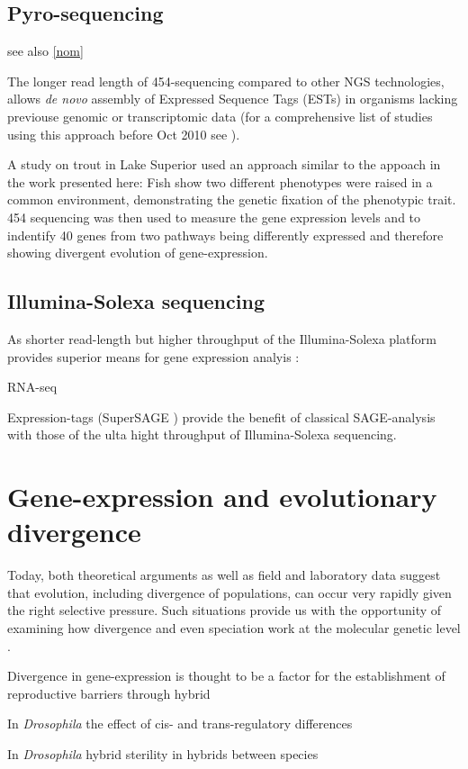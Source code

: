\subsection{Pyro-sequencing}
\label{pyro-seq}

see also \ref{nom}

The longer read length of 454-sequencing \cite{pmid16056220} compared
to other NGS technologies, allows \textit{de novo} assembly of
Expressed Sequence Tags (ESTs) in organisms lacking previouse genomic
or transcriptomic data (for a comprehensive list of studies using this
approach before Oct 2010 see \cite{pmid20950480}).

A study on trout in Lake Superior \cite{pmid20331779} used an approach
similar to the appoach in the work presented here: Fish show two
different phenotypes were raised in a common environment,
demonstrating the genetic fixation of the phenotypic trait. 454
sequencing was then used to measure the gene expression levels and to
indentify 40 genes from two pathways being differently expressed and
therefore showing divergent evolution of gene-expression.


\subsection{Illumina-Solexa sequencing}
\label{ill-seq}




As shorter read-length but higher throughput of the Illumina-Solexa
platform provides superior means for gene expression analyis
\cite{pmid21627854}:

RNA-seq \cite{pmid19015660}

Expression-tags (SuperSAGE \cite{pmid20967605}) provide the benefit of
classical SAGE-analysis \cite{pmid7570003} with those of the ulta
hight throughput of Illumina-Solexa sequencing.


\section{Gene-expression and evolutionary divergence}

Today, both theoretical arguments as well as field and laboratory data
suggest that evolution, including divergence of populations, can occur
very rapidly given the right selective pressure. Such situations
provide us with the opportunity of examining how divergence and even
speciation work at the molecular genetic level
\cite{via_ecological_2002} .

Divergence in gene-expression is thought to be a factor for the
establishment of reproductive barriers through hybrid

In \textit{Drosophila} the effect of cis- and trans-regulatory
differences \cite{pmid20354124}

In \textit{Drosophila} hybrid sterility in hybrids between species
\cite{pmid16757655}




     